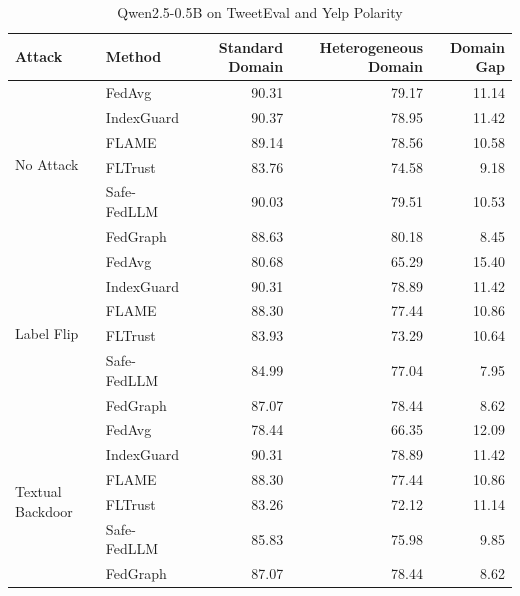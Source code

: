 \documentclass[10pt]{article}
\begin{document}
\begin{table}[htbp]
\centering
\caption{Qwen2.5-0.5B on TweetEval and Yelp Polarity}
\label{tab:qwen05_tweet_yelp}
\small
\begin{tabular}{llrrr}
\toprule
Attack & Method & Standard Domain & Heterogeneous Domain & Domain Gap \\
\midrule
\multirow{6}{*}{No Attack} & FedAvg & 90.31 & 79.17 & 11.14 \\
 & IndexGuard & 90.37 & 78.95 & 11.42 \\
 & FLAME & 89.14 & 78.56 & 10.58 \\
 & FLTrust & 83.76 & 74.58 & 9.18 \\
 & Safe-FedLLM & 90.03 & 79.51 & 10.53 \\
 & FedGraph & 88.63 & 80.18 & 8.45 \\
\midrule
\multirow{6}{*}{Label Flip} & FedAvg & 80.68 & 65.29 & 15.40 \\
 & IndexGuard & 90.31 & 78.89 & 11.42 \\
 & FLAME & 88.30 & 77.44 & 10.86 \\
 & FLTrust & 83.93 & 73.29 & 10.64 \\
 & Safe-FedLLM & 84.99 & 77.04 & 7.95 \\
 & FedGraph & 87.07 & 78.44 & 8.62 \\
\midrule
\multirow{6}{*}{Textual Backdoor} & FedAvg & 78.44 & 66.35 & 12.09 \\
 & IndexGuard & 90.31 & 78.89 & 11.42 \\
 & FLAME & 88.30 & 77.44 & 10.86 \\
 & FLTrust & 83.26 & 72.12 & 11.14 \\
 & Safe-FedLLM & 85.83 & 75.98 & 9.85 \\
 & FedGraph & 87.07 & 78.44 & 8.62 \\
\bottomrule
\end{tabular}
\end{table}
\clearpage
\end{document}
